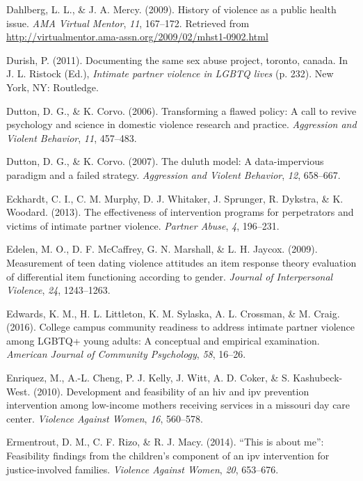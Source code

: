 \documentclass[11pt,]{tufte-book}
\begin{document}
\hypertarget{ref-dahlberg2009history}{}
Dahlberg, L. L., \& J. A. Mercy. (2009). History of violence as a public
health issue. \emph{AMA Virtual Mentor}, \emph{11}, 167--172. Retrieved
from \url{http://virtualmentor.ama-assn.org/2009/02/mhst1-0902.html}

\hypertarget{ref-durish2011documenting}{}
Durish, P. (2011). Documenting the same sex abuse project, toronto,
canada. In J. L. Ristock (Ed.), \emph{Intimate partner violence in LGBTQ
lives} (p. 232). New York, NY: Routledge.

\hypertarget{ref-dutton2006transforming}{}
Dutton, D. G., \& K. Corvo. (2006). Transforming a flawed policy: A call
to revive psychology and science in domestic violence research and
practice. \emph{Aggression and Violent Behavior}, \emph{11}, 457--483.

\hypertarget{ref-dutton2007duluth}{}
Dutton, D. G., \& K. Corvo. (2007). The duluth model: A data-impervious
paradigm and a failed strategy. \emph{Aggression and Violent Behavior},
\emph{12}, 658--667.

\hypertarget{ref-eckhardt2013effectiveness}{}
Eckhardt, C. I., C. M. Murphy, D. J. Whitaker, J. Sprunger, R. Dykstra,
\& K. Woodard. (2013). The effectiveness of intervention programs for
perpetrators and victims of intimate partner violence. \emph{Partner
Abuse}, \emph{4}, 196--231.

\hypertarget{ref-edelen2009measurement}{}
Edelen, M. O., D. F. McCaffrey, G. N. Marshall, \& L. H. Jaycox. (2009).
Measurement of teen dating violence attitudes an item response theory
evaluation of differential item functioning according to gender.
\emph{Journal of Interpersonal Violence}, \emph{24}, 1243--1263.

\hypertarget{ref-edwards2016college}{}
Edwards, K. M., H. L. Littleton, K. M. Sylaska, A. L. Crossman, \& M.
Craig. (2016). College campus community readiness to address intimate
partner violence among LGBTQ+ young adults: A conceptual and empirical
examination. \emph{American Journal of Community Psychology}, \emph{58},
16--26.

\hypertarget{ref-enriquez2010development}{}
Enriquez, M., A.-L. Cheng, P. J. Kelly, J. Witt, A. D. Coker, \& S.
Kashubeck-West. (2010). Development and feasibility of an hiv and ipv
prevention intervention among low-income mothers receiving services in a
missouri day care center. \emph{Violence Against Women}, \emph{16},
560--578.

\hypertarget{ref-ermentrout2014this}{}
Ermentrout, D. M., C. F. Rizo, \& R. J. Macy. (2014). ``This is about
me'': Feasibility findings from the children's component of an ipv
intervention for justice-involved families. \emph{Violence Against
Women}, \emph{20}, 653--676.
\end{document}
